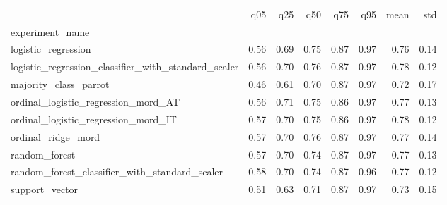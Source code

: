 \begin{tabular}{lrrrrrrr}
\toprule
 & q05 & q25 & q50 & q75 & q95 & mean & std \\
experiment_name &  &  &  &  &  &  &  \\
\midrule
logistic_regression & 0.56 & 0.69 & 0.75 & 0.87 & 0.97 & 0.76 & 0.14 \\
logistic_regression_classifier_with_standard_scaler & 0.56 & 0.70 & 0.76 & 0.87 & 0.97 & 0.78 & 0.12 \\
majority_class_parrot & 0.46 & 0.61 & 0.70 & 0.87 & 0.97 & 0.72 & 0.17 \\
ordinal_logistic_regression_mord_AT & 0.56 & 0.71 & 0.75 & 0.86 & 0.97 & 0.77 & 0.13 \\
ordinal_logistic_regression_mord_IT & 0.57 & 0.70 & 0.75 & 0.86 & 0.97 & 0.78 & 0.12 \\
ordinal_ridge_mord & 0.57 & 0.70 & 0.76 & 0.87 & 0.97 & 0.77 & 0.14 \\
random_forest & 0.57 & 0.70 & 0.74 & 0.87 & 0.97 & 0.77 & 0.13 \\
random_forest_classifier_with_standard_scaler & 0.58 & 0.70 & 0.74 & 0.87 & 0.96 & 0.77 & 0.12 \\
support_vector & 0.51 & 0.63 & 0.71 & 0.87 & 0.97 & 0.73 & 0.15 \\
\bottomrule
\end{tabular}
